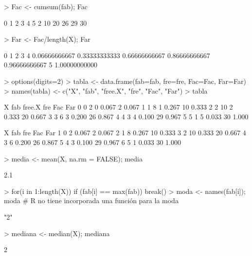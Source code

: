 \documentclass{article}
\begin{document}
\begin{Schunk}
\begin{Sinput}
> Fac <- cumsum(fab); Fac
\end{Sinput}
\begin{Soutput}
 0  1  2  3  4  5 
 2 10 20 26 29 30 
\end{Soutput}
\begin{Sinput}
> Far <- Fac/length(X); Far
\end{Sinput}
\begin{Soutput}
            0             1             2             3             4 
0.06666666667 0.33333333333 0.66666666667 0.86666666667 0.96666666667 
            5 
1.00000000000 
\end{Soutput}
\begin{Sinput}
> options(digits=2)
> tabla <- data.frame(fab=fab, fre=fre, Fac=Fac, Far=Far)
> names(tabla) <- c("X", "fab", "free.X", "fre", "Fac", "Far")
> tabla
\end{Sinput}
\begin{Soutput}
  X fab free.X   fre Fac   Far
0 0   2      0 0.067   2 0.067
1 1   8      1 0.267  10 0.333
2 2  10      2 0.333  20 0.667
3 3   6      3 0.200  26 0.867
4 4   3      4 0.100  29 0.967
5 5   1      5 0.033  30 1.000
\end{Soutput}
\begin{Soutput}
  X fab   fre Fac   Far
1 0   2 0.067   2 0.067
2 1   8 0.267  10 0.333
3 2  10 0.333  20 0.667
4 3   6 0.200  26 0.867
5 4   3 0.100  29 0.967
6 5   1 0.033  30 1.000
\end{Soutput}
\begin{Sinput}
> media <- mean(X, na.rm = FALSE); media
\end{Sinput}
\begin{Soutput}
[1] 2.1
\end{Soutput}
\begin{Sinput}
> for(i in 1:length(X)) if (fab[i] == max(fab)) break()
> moda <- names(fab[i]); moda # R no tiene incorporada una función para la moda
\end{Sinput}
\begin{Soutput}
[1] "2"
\end{Soutput}
\begin{Sinput}
> mediana <- median(X); mediana
\end{Sinput}
\begin{Soutput}
[1] 2

\end{Soutput}
\end{Schunk}
\end{document}
